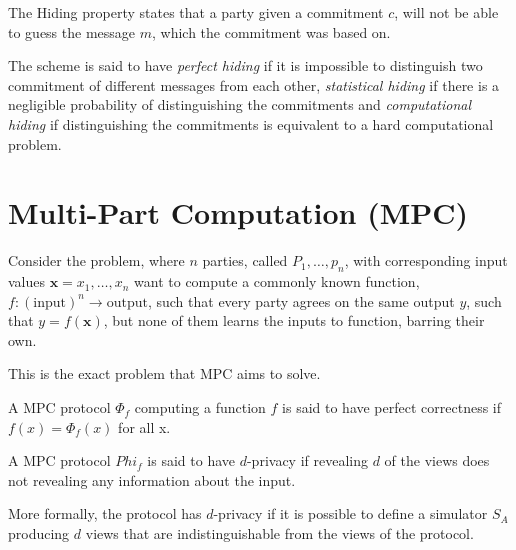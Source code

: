 \begin{definition}
The Hiding property states that a party given a commitment $c$, will not be able
to guess the message $m$, which the commitment was based on.

The scheme is said to have \textit{perfect hiding} if it is impossible to
distinguish two commitment of different messages from each other,
\textit{statistical hiding} if there is a negligible probability of
distinguishing the commitments and \textit{computational hiding} if
distinguishing the commitments is equivalent to a hard computational problem.
\end{definition}


\section{Multi-Part Computation (MPC)}
\label{sec:background:mpc}
Consider the problem, where $n$ parties, called $P_{1}, \dots, p_{n}$, with
corresponding input values $\textbf{x} = x_{1}, \dots, x_{n}$ want to compute a commonly
known function, $f : (\text{input})^{n} \rightarrow \text{output}$, such that
every party agrees on the same output $y$, such that $y = f(\textbf{x})$, but none of them learns the inputs to function, barring their own.


This is the exact problem that MPC aims to solve.

\begin{definition}
  \label{def:mpc:correctness}
  A MPC protocol $\Phi_{f}$ computing a function $f$ is said to have perfect
  correctness if $f(x) = \Phi_{f}(x)$ for all x.
\end{definition}

\begin{definition}[d-Privacy]
\label{def:mpc:d-privacy}
  A MPC protocol $Phi_{f}$ is said to have $d$-privacy if revealing $d$ of the
  views does not revealing any information about the input.

  More formally, the protocol has $d$-privacy if it is possible to define a
  simulator $S_{A}$ producing $d$ views that are indistinguishable from the
  views of the protocol.
\end{definition}

